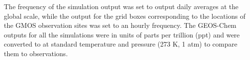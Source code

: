 \begin{table}[H]
\label{tab:geos_chem_simulation_description}

\centering
{}
\end{table}

\begin{flushleft}
 The frequency of the simulation output was set to output daily \hg averages at the global scale, while the \hg output for the grid boxes corresponding to the locations of the GMOS observation sites was set to an hourly frequency. The GEOS-Chem outputs for all the simulations were in units of parts per trillion (ppt) and were converted to \nang at standard temperature and pressure (273 K, 1 atm) to compare them to observations.
\end{flushleft}


